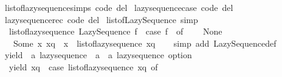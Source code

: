 \begin{isabellebody}
\isanewline
{}\isamarkupfalse%
\ list{\isacharunderscore}{\kern0pt}of{\isacharunderscore}{\kern0pt}lazy{\isacharunderscore}{\kern0pt}sequence{\isachardot}{\kern0pt}simps\ {\isacharbrackleft}{\kern0pt}code\ del{\isacharbrackright}{\kern0pt}\isanewline
{}\isamarkupfalse%
\ lazy{\isacharunderscore}{\kern0pt}sequence{\isachardot}{\kern0pt}case\ {\isacharbrackleft}{\kern0pt}code\ del{\isacharbrackright}{\kern0pt}\isanewline
{}\isamarkupfalse%
\ lazy{\isacharunderscore}{\kern0pt}sequence{\isachardot}{\kern0pt}rec\ {\isacharbrackleft}{\kern0pt}code\ del{\isacharbrackright}{\kern0pt}\isanewline
\isanewline
{}\isamarkupfalse%
\ list{\isacharunderscore}{\kern0pt}of{\isacharunderscore}{\kern0pt}Lazy{\isacharunderscore}{\kern0pt}Sequence\ {\isacharbrackleft}{\kern0pt}simp{\isacharbrackright}{\kern0pt}{\isacharcolon}{\kern0pt}\isanewline
\ \ {\isachardoublequoteopen}list{\isacharunderscore}{\kern0pt}of{\isacharunderscore}{\kern0pt}lazy{\isacharunderscore}{\kern0pt}sequence\ {\isacharparenleft}{\kern0pt}Lazy{\isacharunderscore}{\kern0pt}Sequence\ f{\isacharparenright}{\kern0pt}\ {\isacharequal}{\kern0pt}\ {\isacharparenleft}{\kern0pt}case\ f\ {\isacharparenleft}{\kern0pt}{\isacharparenright}{\kern0pt}\ of\isanewline
\ \ \ \ None\ {\isasymRightarrow}\ {\isacharbrackleft}{\kern0pt}{\isacharbrackright}{\kern0pt}\isanewline
\ \ {\isacharbar}{\kern0pt}\ Some\ {\isacharparenleft}{\kern0pt}x{\isacharcomma}{\kern0pt}\ xq{\isacharparenright}{\kern0pt}\ {\isasymRightarrow}\ x\ {\isacharhash}{\kern0pt}\ list{\isacharunderscore}{\kern0pt}of{\isacharunderscore}{\kern0pt}lazy{\isacharunderscore}{\kern0pt}sequence\ xq{\isacharparenright}{\kern0pt}{\isachardoublequoteclose}\isanewline
%
\isadelimproof
\ \ %
\endisadelimproof
%
\isatagproof
{}\isamarkupfalse%
\ {\isacharparenleft}{\kern0pt}simp\ add{\isacharcolon}{\kern0pt}\ Lazy{\isacharunderscore}{\kern0pt}Sequence{\isacharunderscore}{\kern0pt}def{\isacharparenright}{\kern0pt}%
\endisatagproof
{\isafoldproof}%
%
\isadelimproof
\isanewline
%
\endisadelimproof
\isanewline
{}\isamarkupfalse%
\ yield\ {\isacharcolon}{\kern0pt}{\isacharcolon}{\kern0pt}\ {\isachardoublequoteopen}{\isacharprime}{\kern0pt}a\ lazy{\isacharunderscore}{\kern0pt}sequence\ {\isasymRightarrow}\ {\isacharparenleft}{\kern0pt}{\isacharprime}{\kern0pt}a\ {\isasymtimes}\ {\isacharprime}{\kern0pt}a\ lazy{\isacharunderscore}{\kern0pt}sequence{\isacharparenright}{\kern0pt}\ option{\isachardoublequoteclose}\isanewline
{}\isanewline
\ \ {\isachardoublequoteopen}yield\ xq\ {\isacharequal}{\kern0pt}\ {\isacharparenleft}{\kern0pt}case\ list{\isacharunderscore}{\kern0pt}of{\isacharunderscore}{\kern0pt}lazy{\isacharunderscore}{\kern0pt}sequence\ xq\ of\isanewline

\end{isabellebody}
